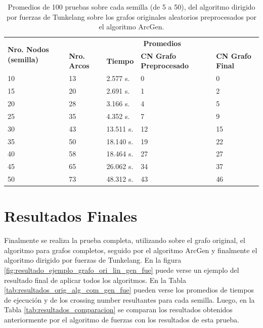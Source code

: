 \begin{table}[H]
	\caption{Promedios de 100 pruebas sobre cada semilla (de 5 a 50), del algoritmo dirigido por fuerzas de Tunkelang sobre los grafos originales aleatorios preprocesados por el algoritmo ArcGen.}
	\label{tab:resultados_gen_alg_fue}
	\begin{tabularx}{\linewidth}{|p{1.5cm}|p{1.2cm}|p{1.5cm}|X|X|}
		\hline
		\multirow{2}{2cm}{\textbf{Nro. Nodos (semilla)}} & \multicolumn{4}{c|}{\textbf{Promedios}} \\
		\cline{2-5}
		& \textbf{Nro. Arcos} & \textbf{Tiempo} & \textbf{CN Grafo Preprocesado} & \textbf{CN Grafo Final} \\
		\hline
		10 & 13 & 2.577 s. & 0 & 0 \\
		\hline
		15 & 20 & 2.691 s. & 1 & 2 \\
		\hline
		20 & 28 & 3.166 s. & 4 & 5 \\
		\hline
		25 & 35 & 4.352 s. & 7 & 9 \\
		\hline
		30 & 43 & 13.511 s. & 12 & 15 \\
		\hline
		35 & 50 & 18.140 s. & 19 & 22 \\
		\hline
		40 & 58 & 18.464 s. & 27 & 27 \\
		\hline
		45 & 65 & 26.062 s. & 34 & 37 \\
		\hline
		50 & 73 & 48.312 s. & 43 & 46 \\
		\hline
	\end{tabularx}
\end{table}

\section{Resultados Finales}
\label{sec:resultados_finales}
Finalmente se realiza la prueba completa, utilizando sobre el grafo original, el algoritmo para grafos completos, seguido por el algoritmo ArcGen y finalmente el algoritmo dirigido por fuerzas de Tunkelang. En la figura \ref{fig:resultado_ejemplo_grafo_ori_lin_gen_fue} puede verse un ejemplo del resultado final de aplicar todos los algoritmos. En la Tabla \ref{tab:resultados_orig_alg_com_gen_fue} pueden verse los promedios de tiempos de ejecución y de los crossing number resultantes para cada semilla. Luego, en la Tabla \ref{tab:resultados_comparacion} se comparan los resultados obtenidos anteriormente por el algoritmo de fuerzas con los resultados de esta prueba.

